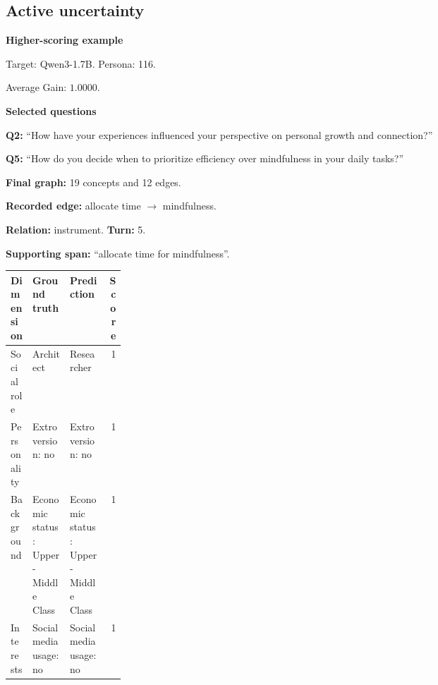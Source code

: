 \documentclass{ieeeaccess}
\begin{document}
\begin{multicols*}{2}
\subsection{Active uncertainty}
\par\medskip\noindent\begin{minipage}{\linewidth}
\textbf{Higher-scoring example}\par
\noindent Target: Qwen3-1.7B. Persona: 116.\par
\noindent Average Gain: $1.0000$.\par\smallskip
\noindent\textbf{Selected questions}\par
\noindent\textbf{Q2:} ``How have your experiences influenced your perspective on personal growth and connection?''\par
\noindent\textbf{Q5:} ``How do you decide when to prioritize efficiency over mindfulness in your daily tasks?''\par\smallskip
\noindent\textbf{Final graph:} 19 concepts and 12 edges.\par
\noindent\textbf{Recorded edge:} allocate time $\rightarrow$ mindfulness.\par
\noindent\textbf{Relation:} instrument. \textbf{Turn:} 5.\par
\noindent\textbf{Supporting span:} ``allocate time for mindfulness''.\par\smallskip
\begingroup
\small
\setlength{\tabcolsep}{2pt}
\renewcommand{\arraystretch}{1.12}
\noindent\begin{tabularx}{\linewidth}{@{}p{0.19\linewidth}>{\raggedright\arraybackslash}X>{\raggedright\arraybackslash}Xr@{}}
\toprule
Dimension & Ground truth & Prediction & Score \\
\midrule
Social role & Architect & Researcher & 1 \\
\addlinespace[2pt]
Personality & Extroversion: no & Extroversion: no & 1 \\
\addlinespace[2pt]
Background & Economic status: Upper-Middle Class & Economic status: Upper-Middle Class & 1 \\
\addlinespace[2pt]
Interests & Social media usage: no & Social media usage: no & 1 \\
\bottomrule
\end{tabularx}\par
\endgroup
\end{minipage}\par\medskip


\end{multicols*}
\end{document}
